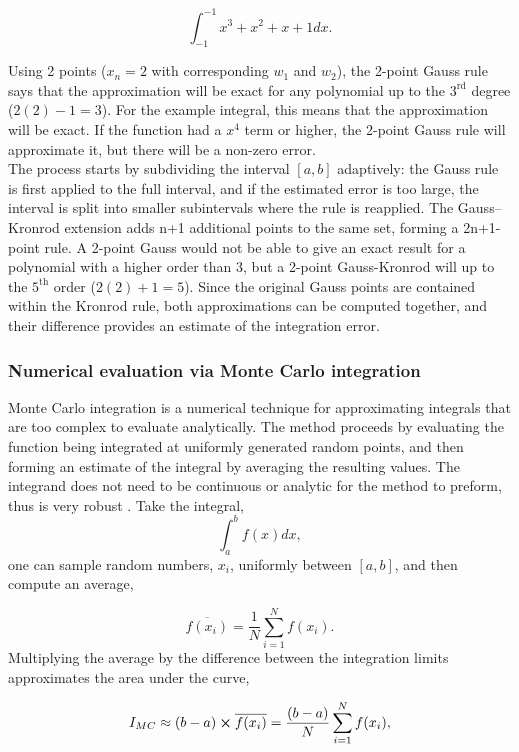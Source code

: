 \documentclass[a4paper,11pt]{article}
\begin{document}
\begin{equation}\label{example-polynomial}
	\int_{-1}^{-1} x^3 +x^2+x+1 dx.	
\end{equation}

Using 2 points ($x_n = 2$ with corresponding $w_1$ and $w_2$), the 2-point Gauss rule says that the approximation will be exact for any polynomial up to the $3^\text{rd}$ degree ($2(2) - 1 = 3$). For the example integral, this means that the approximation will be exact. If the function had a $x^4$ term or higher, the 2-point Gauss  rule will approximate it, but there will be a non-zero error. \\

The process starts by  subdividing the interval $[a,b]$ adaptively: the Gauss rule is first applied to the full interval, and if the estimated error is too large, the interval is split into smaller subintervals where the rule is reapplied. The Gauss–Kronrod extension adds n+1 additional points to the same set, forming a 2n+1-point rule. A 2-point Gauss would not be able to give an exact result for a polynomial with a higher order than 3, but a 2-point Gauss-Kronrod will up to the $5^\text{th}$ order ($2(2)+1 = 5$). Since the original Gauss points are contained within the Kronrod rule, both approximations can be computed together, and their difference provides an estimate of the integration error\cite{QUADPACKwiki}.


\subsubsection{Numerical evaluation via Monte Carlo integration}\label{numerical-MC}
Monte Carlo integration is a numerical technique for approximating integrals that are too complex to evaluate analytically. The method proceeds by evaluating the function being integrated at uniformly generated random points, and then forming an estimate of the integral by averaging the resulting values\cite{tang2023notemontecarlointegration}. The integrand does not need to be continuous or analytic for the method to preform, thus is very robust \cite{Lepage:2020tgj}. Take the integral,
$$
\int_a^b f(x) dx,
$$
one can sample random numbers, ${x_i}$, uniformly between $[a,b]$, and then compute an average,

$$
\overline{f(x_i)} = \frac{1}{N}\sum_{i=1}^{N}f(x_i).
$$
Multiplying the average by the difference between the integration limits approximates the area under the curve,

\begin{equation}
	I_{MC} \approx (b-a)\cross \overline	{f(x_i)} = \frac{(b-a)}{N}\sum_{i=1}^{N}f(x_i),	
\end{equation}
\end{document}
